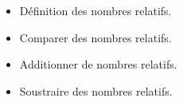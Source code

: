 \begin{prerequis}[Prérequis de $5^e$]    
    \begin{itemize}
        \item Définition des nombres relatifs.
        \item Comparer des nombres relatifs.
        \item Additionner de nombres relatifs.
        \item Soustraire des nombres relatifs.
    \end{itemize}
\end{prerequis}
